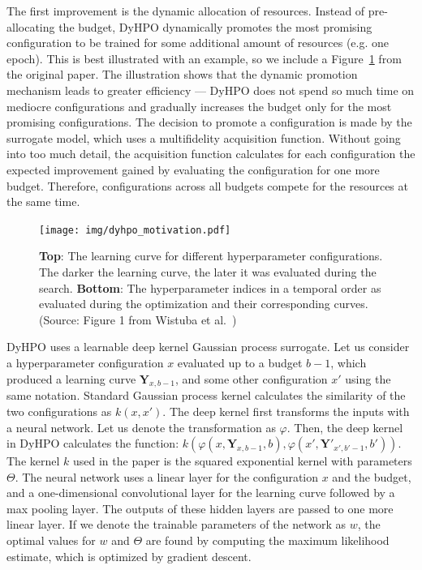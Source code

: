The first improvement is the dynamic allocation of resources. Instead of pre-allocating the budget, DyHPO dynamically promotes the most promising configuration to be trained for some additional amount of resources (e.g. one epoch). This is best illustrated with an example, so we include a Figure~\ref{fig:dyhpo_motivation} from the original paper. The illustration shows that the dynamic promotion mechanism leads to greater efficiency --- DyHPO does not spend so much time on mediocre configurations and gradually increases the budget only for the most promising configurations. The decision to promote a configuration is made by the surrogate model, which uses a multifidelity acquisition function. Without going into too much detail, the acquisition function calculates for each configuration the expected improvement gained by evaluating the configuration for one more budget. Therefore, configurations across all budgets compete for the resources at the same time.

\begin{figure}
    \centering
    \texttt{[image: img/dyhpo\_motivation.pdf]}
    \caption{\textbf{Top}: The learning curve for different hyperparameter configurations. The darker the learning curve, the later it was evaluated during the search. \textbf{Bottom}: The hyperparameter indices in a temporal order as evaluated during the optimization and their corresponding curves. (Source: Figure 1 from Wistuba et al.~\cite{wistuba2022supervising})}
    \label{fig:dyhpo_motivation}
\end{figure}

DyHPO uses a learnable deep kernel Gaussian process surrogate. Let us consider a hyperparameter configuration $x$ evaluated up to a budget $b-1$, which produced a learning curve $\mathbf{Y}_{x,b-1}$, and some other configuration $x'$ using the same notation. Standard Gaussian process kernel calculates the similarity of the two configurations as $k(x,x')$. The deep kernel first transforms the inputs with a neural network. Let us denote the transformation as $\varphi$. Then, the deep kernel in DyHPO calculates the function: $k(\varphi(x,\mathbf{Y}_{x,b-1}, b), \varphi(x',\mathbf{Y}'_{x',b'-1}, b'))$. The kernel $k$ used in the paper is the squared exponential kernel with parameters $\Theta$. The neural network uses a linear layer for the configuration $x$ and the budget, and a one-dimensional convolutional layer for the learning curve followed by a max pooling layer. The outputs of these hidden layers are passed to one more linear layer. If we denote the trainable parameters of the network as $w$, the optimal values for $w$ and $\Theta$ are found by computing the maximum likelihood estimate, which is optimized by gradient descent.

